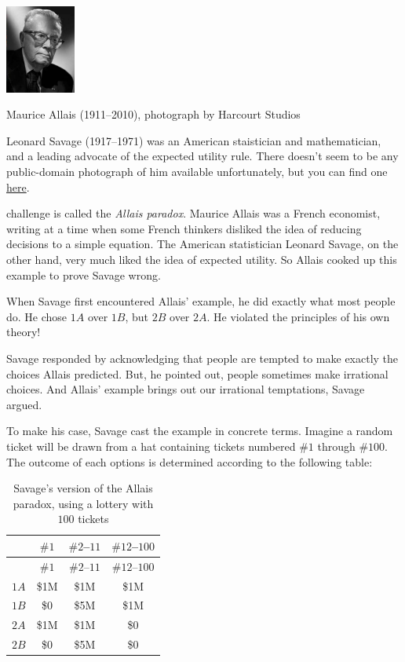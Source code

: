 \documentclass[justified]{tufte-book}
\theoremstyle{definition}
\theoremstyle{definition}
\theoremstyle{definition}
\theoremstyle{remark}
\begin{document}
\begin{marginfigure}
\includegraphics[width=0.91in]{img/allais} \caption[Maurice Allais (1911--2010), photograph by Harcourt Studios]{Maurice Allais (1911--2010), photograph by Harcourt Studios}\label{fig:unnamed-chunk-111}
\end{marginfigure}
\begin{marginfigure}
Leonard Savage (1917--1971) was an American staistician and
mathematician, and a leading advocate of the expected utility rule.
There doesn't seem to be any public-domain photograph of him available
unfortunately, but you can find one
\href{http://policonomics.com/leonard-savage/}{here}.
\end{marginfigure}

 challenge is called the \emph{Allais paradox}. Maurice
Allais was a French economist, writing at a time when some French
thinkers disliked the idea of reducing decisions to a simple equation.
The American statistician Leonard Savage, on the other hand, very much
liked the idea of expected utility. So Allais cooked up this example to
prove Savage wrong.

When Savage first encountered Allais' example, he did exactly what most
people do. He chose \(1A\) over \(1B\), but \(2B\) over \(2A\). He
violated the principles of his own theory!

Savage responded by acknowledging that people are tempted to make
exactly the choices Allais predicted. But, he pointed out, people
sometimes make irrational choices. And Allais' example brings out our
irrational temptations, Savage argued.

To make his case, Savage cast the example in concrete terms. Imagine a
random ticket will be drawn from a hat containing tickets numbered
\(\#1\) through \(\#100\). The outcome of each options is determined
according to the following table:

\begin{longtable}[]{@{}lccc@{}}
\caption{\label{tab:unnamed-chunk-113}Savage's version of the Allais
paradox, using a lottery with \(100\) tickets}\tabularnewline
\toprule
& \(\#1\) & \(\#2\)--\(11\) & \(\#12\)--\(100\)\tabularnewline
\midrule
\endfirsthead
\toprule
& \(\#1\) & \(\#2\)--\(11\) & \(\#12\)--\(100\)\tabularnewline
\midrule
\endhead
\(1A\) & \$1M & \$1M & \$1M\tabularnewline
\(1B\) & \$0 & \$5M & \$1M\tabularnewline
\(2A\) & \$1M & \$1M & \$0\tabularnewline
\(2B\) & \$0 & \$5M & \$0\tabularnewline
\bottomrule
\end{longtable}
\end{document}
